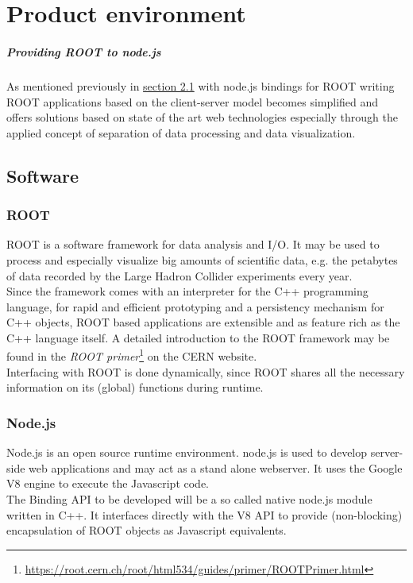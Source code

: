 \chapter{Product environment}

\paragraph{Providing ROOT to node.js}
As mentioned previously in \hyperlink{section.2.1}{section 2.1} with node.js bindings for ROOT writing ROOT applications based on the client-server model becomes simplified and offers solutions based on state of the art web technologies especially through the applied concept of separation of data processing and data visualization.

\section{Software}
\subsection{ROOT}
ROOT is a software framework for data analysis and I/O. It may be used to process and especially visualize big amounts of scientific data, e.g. the petabytes of data recorded by the Large Hadron Collider experiments every year.\\
Since the framework comes with an interpreter for the C++ programming language, for rapid and efficient prototyping and a persistency mechanism for C++ objects, ROOT based applications are  extensible and as feature rich as the C++ language itself.
A detailed introduction to the ROOT framework may be found in the \textit{ROOT  primer}\footnote[1]{\url{https://root.cern.ch/root/html534/guides/primer/ROOTPrimer.html}}
on the CERN website.\\
Interfacing with ROOT is done dynamically, since ROOT shares all the necessary information on its (global) functions during runtime.

\subsection{Node.js}
Node.js is an open source runtime environment. node.js is used to develop server-side web applications and may act as a 
stand alone webserver. It uses the Google V8 engine to execute the Javascript code. \\
The Binding API to be developed will be a so called native node.js module written in C++. It interfaces directly with the V8 API to provide (non-blocking) encapsulation of ROOT objects as Javascript equivalents.

